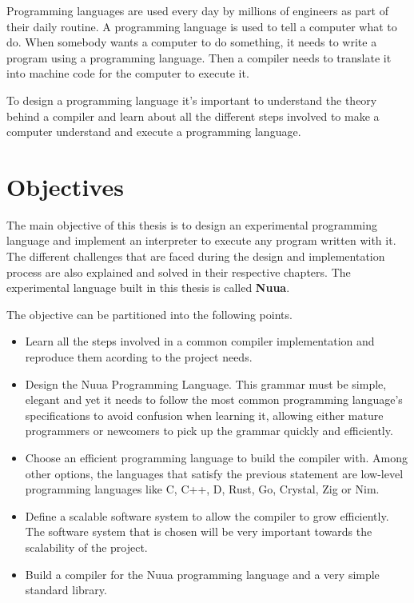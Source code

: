 Programming languages are used every day by millions of engineers as part of their daily routine.
A programming language is used to tell a computer what to do. When
somebody wants a computer to do something, it needs to write a program using a programming language. Then
a compiler needs to translate it into machine code for the computer to execute it.

To design a programming language it's important to understand the theory behind a compiler and learn about all the different
steps involved to make a computer understand and execute a programming language.

\section{Objectives}

The main objective of this thesis is to design an experimental programming language and implement an interpreter to execute
any program written with it. The different challenges that are faced during the design and implementation process are also explained and
solved in their respective chapters. The experimental language built in this thesis is called \textbf{Nuua}.

The objective can be partitioned into the following points.

\begin{itemize}
    \item Learn all the steps involved in a common compiler implementation and reproduce them acording to the project needs.
    \item Design the Nuua Programming Language. This grammar must be simple, elegant and yet it needs to follow the most
        common programming language's specifications to avoid confusion when learning it, allowing either mature programmers or newcomers to pick up the grammar quickly and efficiently.
    \item Choose an efficient programming language to build the compiler with. Among other options, the languages that satisfy the previous
    statement are low-level programming languages like C, C++, D, Rust, Go, Crystal, Zig or Nim.
    \item Define a scalable software system to allow the compiler to grow efficiently. The software system that is chosen will be very important towards the scalability of the project.
    \item Build a compiler for the Nuua programming language and a very simple standard library.
\end{itemize}

